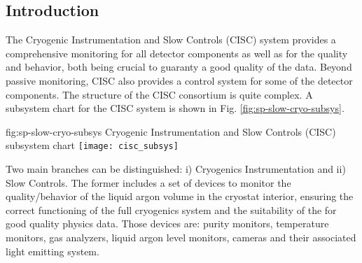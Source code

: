 \subsection{Introduction}
\label{sec:fddp-slow-cryo-intro}



The Cryogenic Instrumentation and Slow Controls (CISC) system provides
a comprehensive monitoring for all detector components as well as for the  quality and behavior, both being crucial
to guaranty a good quality of the data. Beyond passive monitoring, CISC also provides a control system for some of the detector components. 
The structure of the CISC consortium is quite complex. A subsystem chart
for the CISC system is shown in Fig. \ref{fig:sp-slow-cryo-subsys}. 

\begin{dunefigure}{fig:sp-slow-cryo-subsys}
{Cryogenic Instrumentation and Slow Controls (CISC) subsystem chart}
\texttt{[image: cisc\_subsys]}
\end{dunefigure}

Two main branches can be distinguished: i) Cryogenics Instrumentation and ii) Slow Controls. The former includes a set of devices 
to monitor the quality/behavior of the liquid argon volume in the cryostat interior, ensuring the correct functioning of
the full cryogenics system and the suitability of the  for good quality physics data. Those devices are:
purity monitors, temperature monitors, gas analyzers, liquid argon level monitors, cameras and their associated
light emitting system.

